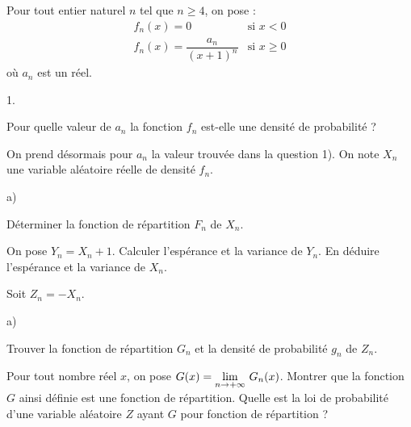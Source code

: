 \documentclass[11pt]{article}%
\begin{document}
Pour tout entier naturel $n$ tel que $n\geq 4$, on pose : 
\[
\begin{array}{ll}
f_{n}(x) = 0 & \text{si }x<0 \\
f_{n}(x) = \dfrac{a_{n}}{(x + 1)^{n}} & \text{si }x\geq 0
\end{array}
\]
où $a_{n}$ est un réel.

\begin{noliste}{1.}
 \setlength{\itemsep}{4mm}
\item Pour quelle valeur de $a_{n}$ la fonction $f_{n}$ est-elle une
densité
de probabilité ?

\item On prend désormais pour $a_{n}$ la valeur trouvée dans la
question 1).
On note $X_{n}$ une variable aléatoire réelle de densité $f_{n}$.

\begin{noliste}{a)}
 \setlength{\itemsep}{2mm}
\item Déterminer la fonction de répartition $F_{n}$ de $X_{n}$.

\item On pose $Y_{n} = X_{n} + 1$. Calculer l'espérance et la variance
de $Y_{n}$. En déduire l'espérance et la variance de $X_{n}$.
\end{noliste}

\item Soit $Z_{n} = -X_{n}$.

\begin{noliste}{a)}
 \setlength{\itemsep}{2mm}
\item Trouver la fonction de répartition $G_{n}$ et la densité de
probabilité
$g_{n}$ de $Z_{n}$.

\item Pour tout nombre réel $x$, on pose $G(x) = {\displaystyle \lim_{n\rightarrow
 + \infty } \ }G_{n}(x)$. Montrer que la fonction $G$ ainsi définie est une
fonction de répartition. Quelle est la loi de probabilité d'une
variable aléatoire $Z$ ayant $G$ pour fonction de répartition ?
\end{noliste}
\end{noliste}

\label{fin}
\end{document}
